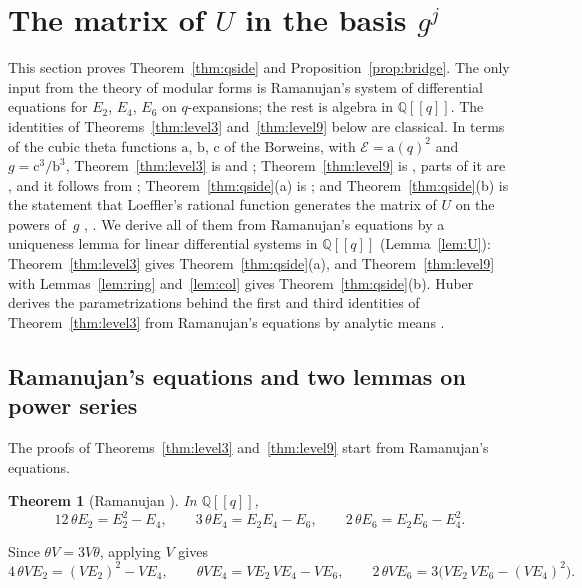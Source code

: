 \documentclass[11pt]{amsart}
\newtheorem{theorem}{Theorem}[section]
\theoremstyle{definition}
\numberwithin{equation}{section}
\newcommand{\lean}[1]{\ignorespaces}
\newcommand{\Q}{\mathbb{Q}}
\newcommand{\cE}{\mathcal{E}}
\begin{document}
\section{The matrix of \texorpdfstring{$U$}{U} in the basis \texorpdfstring{$g^j$}{g\^{}j}}\label{sec:qside}

This section proves Theorem~\ref{thm:qside} and Proposition~\ref{prop:bridge}. The only input from the theory of modular forms is Ramanujan's system of differential equations for $E_2$, $E_4$, $E_6$ on $q$-expansions; the rest is algebra in $\Q[[q]]$. The identities of Theorems~\ref{thm:level3} and~\ref{thm:level9} below are classical. In terms of the cubic theta functions $\mathrm a$, $\mathrm b$, $\mathrm c$ of the Borweins, with $\cE=\mathrm a(q)^2$ and $g=\mathrm c^3/\mathrm b^3$, Theorem~\ref{thm:level3} is \cite[Theorems~4.2 to~4.5]{BBG95} and \cite[Theorem~4.31]{Coo17}; Theorem~\ref{thm:level9} is \cite[Theorems~9.2 and~9.4]{Coo17}, parts of it are \cite[Lemma~2.4]{Roe14}, and it follows from \cite[(2.9) and Theorem~3.1]{BBG95}; Theorem~\ref{thm:qside}(a) is \cite[Theorem~4.32]{Coo17}; and Theorem~\ref{thm:qside}(b) is the statement that Loeffler's rational function generates the matrix of $U$ on the powers of~$g$ \cite[\S4]{Smi04}, \cite[\S2]{Loe07}. We derive all of them from Ramanujan's equations by a uniqueness lemma for linear differential systems in $\Q[[q]]$ (Lemma~\ref{lem:U}): Theorem~\ref{thm:level3} gives Theorem~\ref{thm:qside}(a), and Theorem~\ref{thm:level9} with Lemmas~\ref{lem:ring} and~\ref{lem:col} gives Theorem~\ref{thm:qside}(b). Huber derives the parametrizations behind the first and third identities of Theorem~\ref{thm:level3} from Ramanujan's equations by analytic means \cite[\S4]{Hub09}.

\subsection{Ramanujan's equations and two lemmas on power series}
The proofs of Theorems~\ref{thm:level3} and~\ref{thm:level9} start from Ramanujan's equations.

\begin{theorem}[Ramanujan {\cite[(30)]{Ram16}}]\label{thm:ram}\lean{CalegariSlopes.Bridge.ram_E2, CalegariSlopes.Bridge.ram_E4, CalegariSlopes.Bridge.ram_E6}
In $\Q[[q]]$,
\[
12\,\theta E_2=E_2^2-E_4,\qquad 3\,\theta E_4=E_2E_4-E_6,\qquad 2\,\theta E_6=E_2E_6-E_4^2 .
\]
\end{theorem}

Since $\theta V=3V\theta$, applying $V$ gives
\begin{equation}\label{eq:ramV}
4\,\theta VE_2=(VE_2)^2-VE_4,\qquad \theta VE_4=VE_2\,VE_4-VE_6,\qquad 2\,\theta VE_6=3\bigl(VE_2\,VE_6-(VE_4)^2\bigr).
\end{equation}
\end{document}
